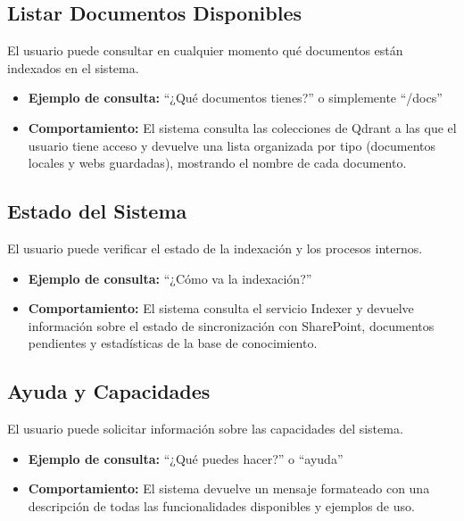 \subsection{Listar Documentos Disponibles}
\label{subsec:modo-listar}

El usuario puede consultar en cualquier momento qué documentos están indexados en el sistema.

\begin{itemize}
    \item \textbf{Ejemplo de consulta:} ``¿Qué documentos tienes?'' o simplemente ``/docs''
    \item \textbf{Comportamiento:} El sistema consulta las colecciones de Qdrant a las que el usuario tiene acceso y devuelve una lista organizada por tipo (documentos locales y webs guardadas), mostrando el nombre de cada documento.
\end{itemize}

\subsection{Estado del Sistema}
\label{subsec:modo-status}

El usuario puede verificar el estado de la indexación y los procesos internos.

\begin{itemize}
    \item \textbf{Ejemplo de consulta:} ``¿Cómo va la indexación?''
    \item \textbf{Comportamiento:} El sistema consulta el servicio Indexer y devuelve información sobre el estado de sincronización con SharePoint, documentos pendientes y estadísticas de la base de conocimiento.
\end{itemize}

\subsection{Ayuda y Capacidades}
\label{subsec:modo-ayuda}

El usuario puede solicitar información sobre las capacidades del sistema.

\begin{itemize}
    \item \textbf{Ejemplo de consulta:} ``¿Qué puedes hacer?'' o ``ayuda''
    \item \textbf{Comportamiento:} El sistema devuelve un mensaje formateado con una descripción de todas las funcionalidades disponibles y ejemplos de uso.
\end{itemize}

